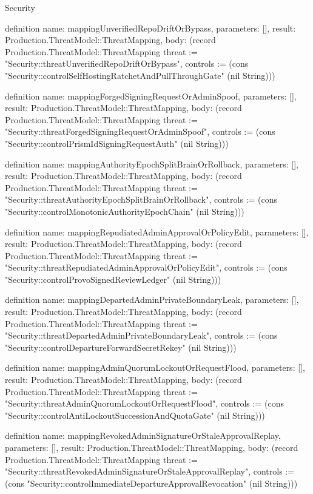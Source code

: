 \begin{lexlean}{Security}
\begin{semanticmodule}
definition{
  name: mappingUnverifiedRepoDriftOrBypass,
  parameters: [],
  result: Production.ThreatModel::ThreatMapping,
  body: (record Production.ThreatModel::ThreatMapping {threat := "Security::threatUnverifiedRepoDriftOrBypass", controls := (cons "Security::controlSelfHostingRatchetAndPullThroughGate" (nil String))})
}

definition{
  name: mappingForgedSigningRequestOrAdminSpoof,
  parameters: [],
  result: Production.ThreatModel::ThreatMapping,
  body: (record Production.ThreatModel::ThreatMapping {threat := "Security::threatForgedSigningRequestOrAdminSpoof", controls := (cons "Security::controlPrismIdSigningRequestAuth" (nil String))})
}

definition{
  name: mappingAuthorityEpochSplitBrainOrRollback,
  parameters: [],
  result: Production.ThreatModel::ThreatMapping,
  body: (record Production.ThreatModel::ThreatMapping {threat := "Security::threatAuthorityEpochSplitBrainOrRollback", controls := (cons "Security::controlMonotonicAuthorityEpochChain" (nil String))})
}

definition{
  name: mappingRepudiatedAdminApprovalOrPolicyEdit,
  parameters: [],
  result: Production.ThreatModel::ThreatMapping,
  body: (record Production.ThreatModel::ThreatMapping {threat := "Security::threatRepudiatedAdminApprovalOrPolicyEdit", controls := (cons "Security::controlProvoSignedReviewLedger" (nil String))})
}

definition{
  name: mappingDepartedAdminPrivateBoundaryLeak,
  parameters: [],
  result: Production.ThreatModel::ThreatMapping,
  body: (record Production.ThreatModel::ThreatMapping {threat := "Security::threatDepartedAdminPrivateBoundaryLeak", controls := (cons "Security::controlDepartureForwardSecretRekey" (nil String))})
}

definition{
  name: mappingAdminQuorumLockoutOrRequestFlood,
  parameters: [],
  result: Production.ThreatModel::ThreatMapping,
  body: (record Production.ThreatModel::ThreatMapping {threat := "Security::threatAdminQuorumLockoutOrRequestFlood", controls := (cons "Security::controlAntiLockoutSuccessionAndQuotaGate" (nil String))})
}

definition{
  name: mappingRevokedAdminSignatureOrStaleApprovalReplay,
  parameters: [],
  result: Production.ThreatModel::ThreatMapping,
  body: (record Production.ThreatModel::ThreatMapping {threat := "Security::threatRevokedAdminSignatureOrStaleApprovalReplay", controls := (cons "Security::controlImmediateDepartureApprovalRevocation" (nil String))})
}


\end{semanticmodule}
\end{lexlean}
